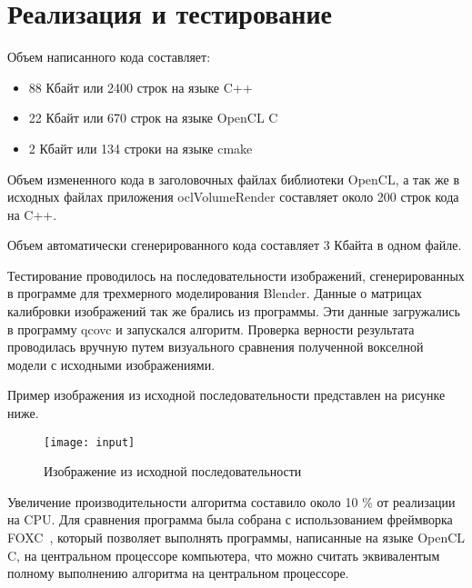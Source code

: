 \section{Реализация и тестирование}
Объем написанного кода составляет:
\begin{itemize}
\item 88 Кбайт или 2400 строк на языке C++
\item 22 Кбайт или 670 строк на языке OpenCL C
\item 2 Кбайт или 134 строки на языке cmake
\end{itemize}

Объем измененного кода в заголовочных файлах библиотеки OpenCL, а так же в исходных файлах приложения oclVolumeRender составляет около 200 строк кода на C++.

Объем автоматически сгенерированного кода составляет 3 Кбайта в одном файле.

Тестирование проводилось на последовательности изображений, сгенерированных в программе для трехмерного моделирования Blender. Данные о матрицах калибровки изображений так же брались из программы. Эти данные загружались в программу qcovc и запускался алгоритм. Проверка верности результата проводилась вручную путем визуального сравнения полученной вокселной модели с исходными изображениями.

Пример изображения из исходной последовательности представлен на рисунке ниже.

\begin{figure}[h]
\center
\texttt{[image: input]}
\caption{Изображение из исходной последовательности}
\end{figure}

Увеличение производительности алгоритма составило около 10 \% от реализации на CPU. Для сравнения программа была собрана с использованием фреймворка FOXC~\cite{foxc}, который позволяет выполнять программы, написанные на языке OpenCL C, на центральном процессоре компьютера, что можно считать эквивалентым полному выполнению алгоритма на центральном процессоре.

